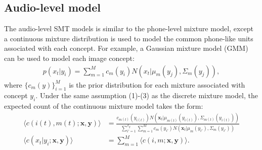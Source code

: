 \documentclass[journal]{IEEEtran}
\begin{document}

\subsection{Audio-level model}
The audio-level SMT models is similar to the phone-level mixture model, except a continuous mixture distribution is used to model the common phone-like units associated with each concept. For example, a Gaussian mixture model (GMM) can be used to model each image concept:
\begin{align}\label{eq:gmm_prob}
    p(x_t|y_i) = \sum_{m=1}^{M} c_m(y_i) N( x_t|\mu_m(y_j), \Sigma_m(y_j)),
\end{align}
where $\{c_m(y)\}_{i=1}^M$ is the prior distribution for each mixture associated with concept $y_i$. Under the same assumption (1)-(3) as the discrete mixture model, the expected count of the continuous mixture model takes the form:
\begin{align}\label{eq:expected_count_gmm}
    \langle c(i(t), m(t);\mathbf x, \mathbf y) \rangle &= \frac{c_{m(t)}(y_{i(t)})N(\mathbf x_t|\mu_{m(t)}(y_{i(t)}), \Sigma_{m(t)}(y_{i(t)}))}{\sum_{i'=1}^{T_y} \sum_{m=1}^M c_m(y_{i'})N(\mathbf x_t|\mu_m(y_{i'}), \Sigma_m(y_{i'}))} \\
    \langle c(x_t|y_i; \mathbf x, \mathbf y) \rangle &= \sum_{m=1}^M \langle c(i, m; \mathbf x, \mathbf y) \rangle.
\end{align}
\end{document}
